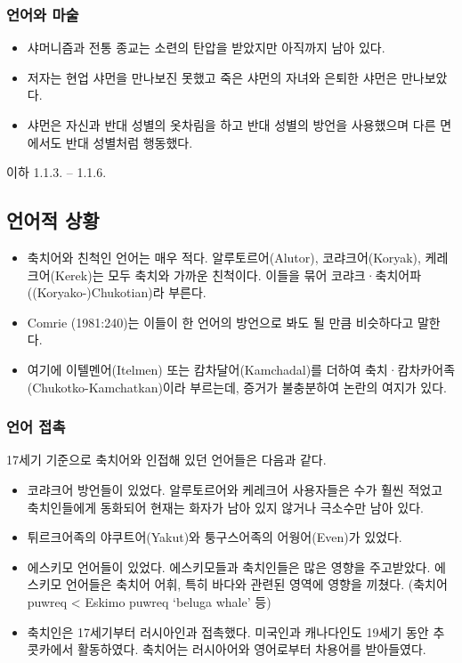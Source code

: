 \subsubsection{언어와 마술}
\begin{itemize}
\item 샤머니즘과 전통 종교는 소련의 탄압을 받았지만 아직까지 남아 있다.
\item 저자는 현업 샤먼을 만나보진 못했고 죽은 샤먼의 자녀와 은퇴한 샤먼은 만나보았다.
\item 샤먼은 자신과 반대 성별의 옷차림을 하고 반대 성별의 방언을 사용했으며 다른 면에서도 반대 성별처럼 행동했다.
\end{itemize}

이하 1.1.3. -- 1.1.6. \omission

\subsection{언어적 상황}
\begin{itemize}
\item 축치어와 친척인 언어는 매우 적다. 알루토르어(Alutor), 코랴크어(Koryak), 케레크어(Kerek)는 모두 축치와 가까운 친척이다. 이들을 묶어 코랴크·축치어파((Koryako-)Chukotian)라 부른다. 
\item Comrie (1981:240)는 이들이 한 언어의 방언으로 봐도 될 만큼 비슷하다고 말한다.
\item 여기에 이텔멘어(Itelmen) 또는 캄차달어(Kamchadal)를 더하여 축치·캄차카어족(Chukotko-Kamchatkan)이라 부르는데, 증거가 불충분하여 논란의 여지가 있다.
\end{itemize}

\subsubsection{언어 접촉}
17세기 기준으로 축치어와 인접해 있던 언어들은 다음과 같다.
\begin{itemize} 
\item 코랴크어 방언들이 있었다. 알루토르어와 케레크어 사용자들은 수가 훨씬 적었고 축치인들에게 동화되어 현재는 화자가 남아 있지 않거나 극소수만 남아 있다. 
\item 튀르크어족의 야쿠트어(Yakut)와 퉁구스어족의 어웡어(Even)가 있었다. 
\item 에스키모 언어들이 있었다. 에스키모들과 축치인들은 많은 영향을 주고받았다. 에스키모 언어들은 축치어 어휘, 특히 바다와 관련된 영역에 영향을 끼쳤다. (축치어 puwreq < Eskimo puwreq ‘beluga whale’ 등)
\item 축치인은 17세기부터 러시아인과 접촉했다. 미국인과 캐나다인도 19세기 동안 추콧카에서 활동하였다. 축치어는 러시아어와 영어로부터 차용어를 받아들였다.
\end{itemize}

